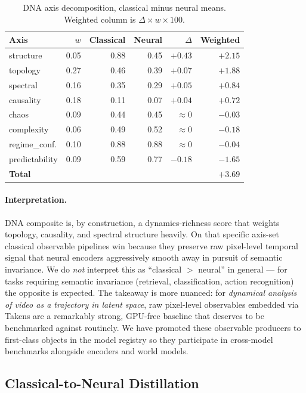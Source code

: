\documentclass[11pt,a4paper]{article}
\begin{document}
\begin{table}[h]
\centering
\caption{DNA axis decomposition, classical minus neural means.
Weighted column is $\Delta\!\times w \!\times\! 100$.}
\label{tab:bias-audit}
\begin{tabular}{lrrrrr}
\toprule
Axis & $w$ & Classical & Neural & $\Delta$ & Weighted \\
\midrule
structure & 0.05 & 0.88 & 0.45 & $+0.43$ & $+2.15$ \\
topology & 0.27 & 0.46 & 0.39 & $+0.07$ & $+1.88$ \\
spectral & 0.16 & 0.35 & 0.29 & $+0.05$ & $+0.84$ \\
causality & 0.18 & 0.11 & 0.07 & $+0.04$ & $+0.72$ \\
chaos & 0.09 & 0.44 & 0.45 & $\approx 0$ & $-0.03$ \\
complexity & 0.06 & 0.49 & 0.52 & $\approx 0$ & $-0.18$ \\
regime\_conf. & 0.10 & 0.88 & 0.88 & $\approx 0$ & $-0.04$ \\
predictability & 0.09 & 0.59 & 0.77 & $-0.18$ & $-1.65$ \\
\midrule
\textbf{Total} & & & & & $+3.69$ \\
\bottomrule
\end{tabular}
\end{table}

\paragraph{Interpretation.}
DNA composite is, by construction, a dynamics-richness score that
weights topology, causality, and spectral structure heavily. On that
specific axis-set classical observable pipelines win because they
preserve raw pixel-level temporal signal that neural encoders
aggressively smooth away in pursuit of semantic invariance.
We do \emph{not} interpret this as ``classical $>$ neural'' in
general — for tasks requiring semantic invariance (retrieval,
classification, action recognition) the opposite is expected.
The takeaway is more nuanced: for \emph{dynamical analysis of
video as a trajectory in latent space}, raw pixel-level observables
embedded via Takens are a remarkably strong, GPU-free baseline that
deserves to be benchmarked against routinely. We have promoted these
observable producers to first-class objects in the model registry
so they participate in cross-model benchmarks alongside encoders and
world models.

\subsection{Classical-to-Neural Distillation}
\end{document}

